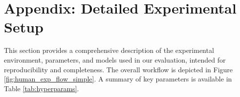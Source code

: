 \documentclass{article}
\begin{document}



\onecolumn

\appendix
\clearpage
\section{Appendix: Detailed Experimental Setup}
\label{sec:appendix_experimental_details}



This section provides a comprehensive description of the experimental environment, parameters, and models used in our evaluation, intended for reproducibility and completeness. The overall workflow is depicted in Figure \ref{fig:human_exp_flow_simple}. A summary of key parameters is available in Table \ref{tab:hyperparams}.
\end{document}
